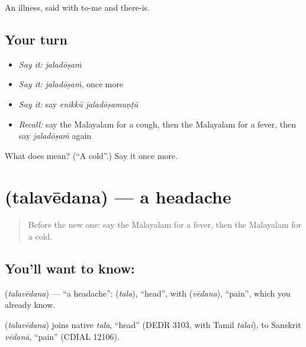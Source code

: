\begin{grammarlens}[title={What you've built}]
An illness, said with to-me and there-is.
\end{grammarlens}

\subsection*{Your turn}
\begin{itemize}
\raggedright
  \item \emph{Say it:} \emph{jaladōṣaṁ}
  \item \emph{Say it:} \emph{jaladōṣaṁ}, once more
  \item \emph{Say it:} say \emph{enikkŭ jaladōṣamuṇṭŭ}
  \item \emph{Recall:} say the Malayalam for a cough, then the Malayalam for a fever, then say \emph{jaladōṣaṁ} again
\end{itemize}

\begin{tcolorbox}[breakable,colback=teal!4,colframe=teal!35!black,title={Before you move on}]
What does  mean? (\textquotedblleft{}A cold\textquotedblright{}.) Say it once more.
\end{tcolorbox}
\section[\texorpdfstring{\ml{തലവേദന} (talavēdana)}{തലവേദന (talavēdana)}]{ (talavēdana) — a headache}

\label{lesson:ML-C115-headache}



\begin{quote}
Before the new one: say the Malayalam for a fever, then the Malayalam for a cold.
\end{quote}

\subsection*{You'll want to know: }
\textbf{} (\emph{talavēdana}) — \textquotedblleft{}a headache\textquotedblright{}: \textbf{} (\emph{tala}), \textquotedblleft{}head\textquotedblright{}, with \textbf{} (\emph{vēdana}), \textquotedblleft{}pain\textquotedblright{}, which you already know.

\begin{cousinweb}
\textbf{} (\emph{talavēdana}) joins native \emph{tala}, \textquotedblleft{}head\textquotedblright{} (DEDR 3103, with Tamil \emph{talai}), to Sanskrit \emph{vēdanā}, \textquotedblleft{}pain\textquotedblright{} (CDIAL 12106).
\end{cousinweb}

